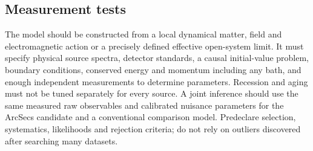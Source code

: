 \documentclass[
  11pt,
  twoside]{article}
\begin{document}
\subsection{Measurement tests}\label{measurement-tests}

The model should be constructed from a local dynamical matter, field and
electromagnetic action or a precisely defined effective open-system
limit. It must specify physical source spectra, detector standards, a
causal initial-value problem, boundary conditions, conserved energy and
momentum including any bath, and enough independent measurements to
determine parameters. Recession and aging must not be tuned separately
for every source. A joint inference should use the same measured raw
observables and calibrated nuisance parameters for the ArcSecs candidate
and a conventional comparison model. Predeclare selection, systematics,
likelihoods and rejection criteria; do not rely on outliers discovered
after searching many datasets.
\end{document}
